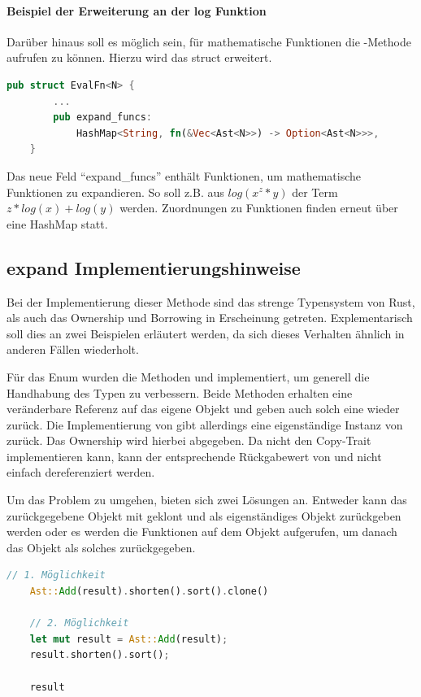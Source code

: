 \documentclass[11pt,a4paper, ngerman]{article}
\begin{document}
\paragraph{Beispiel der Erweiterung an der log Funktion} Darüber hinaus soll es möglich sein, für mathematische Funktionen die -Methode aufrufen zu können. Hierzu wird das struct  erweitert.

\begin{lstlisting}[language=rust, caption={EvalFn nach expand}]
    pub struct EvalFn<N> {
        ...
        pub expand_funcs: 
            HashMap<String, fn(&Vec<Ast<N>>) -> Option<Ast<N>>>,
    }
\end{lstlisting}

Das neue Feld ``expand\_funcs'' enthält Funktionen, um mathematische Funktionen zu expandieren. So soll z.B. aus $log(x^z*y)$ der Term $z*log(x)+log(y)$ werden. Zuordnungen zu Funktionen finden erneut über eine HashMap statt.

\subsection{expand Implementierungshinweise}
Bei der Implementierung dieser Methode sind das strenge Typensystem von Rust, als auch das Ownership und Borrowing in Erscheinung getreten. Explementarisch soll dies an zwei Beispielen erläutert werden, da sich dieses Verhalten ähnlich in anderen Fällen wiederholt.

Für das Enum  wurden die Methoden  und  implementiert, um generell die Handhabung des Typen zu verbessern. Beide Methoden erhalten eine veränderbare Referenz auf das eigene Objekt und geben auch solch eine wieder zurück. Die Implementierung von  gibt allerdings eine eigenständige Instanz von  zurück. Das Ownership wird hierbei abgegeben. Da  nicht den Copy-Trait implementieren kann, kann der entsprechende Rückgabewert von  und  nicht einfach dereferenziert werden.

Um das Problem zu umgehen, bieten sich zwei Lösungen an. Entweder kann das zurückgegebene Objekt mit  geklont und als eigenständiges Objekt zurückgeben werden oder es werden die Funktionen auf dem Objekt aufgerufen, um danach das Objekt als solches zurückgegeben.

\begin{lstlisting}[language=rust, caption={Mögliche Lösungen für Rückgabewerte}]
    // 1. Möglichkeit
    Ast::Add(result).shorten().sort().clone()

    // 2. Möglichkeit
    let mut result = Ast::Add(result);
    result.shorten().sort();

    result
\end{lstlisting}
\end{document}
